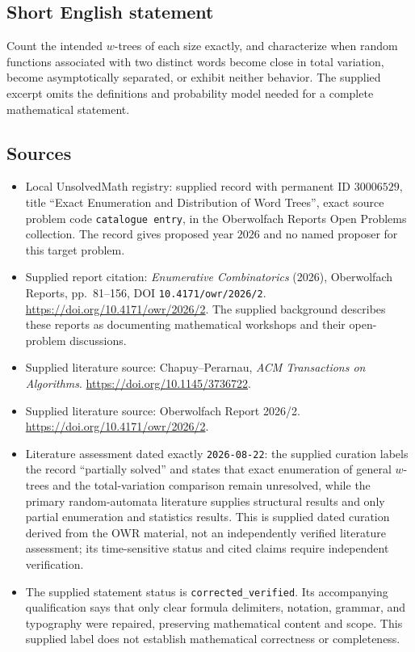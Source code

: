 \documentclass[11pt]{article}
\begin{document}
\subsection{Short English statement}
Count the intended \(w\)-trees of each size exactly, and characterize when random functions associated with two distinct words become close in total variation, become asymptotically separated, or exhibit neither behavior. The supplied excerpt omits the definitions and probability model needed for a complete mathematical statement.
\subsection{Sources}
\begin{itemize}
\item Local UnsolvedMath registry: supplied record with permanent ID \(30006529\), title ``Exact Enumeration and Distribution of Word Trees'', exact source problem code \texttt{catalogue entry}, in the Oberwolfach Reports Open Problems collection. The record gives proposed year \(2026\) and no named proposer for this target problem.
\item Supplied report citation: \emph{Enumerative Combinatorics} (2026), Oberwolfach Reports, pp.~81--156, DOI \texttt{10.4171/owr/2026/2}. \url{https://doi.org/10.4171/owr/2026/2}. The supplied background describes these reports as documenting mathematical workshops and their open-problem discussions.
\item Supplied literature source: Chapuy--Perarnau, \emph{ACM Transactions on Algorithms}. \url{https://doi.org/10.1145/3736722}.
\item Supplied literature source: Oberwolfach Report 2026/2. \url{https://doi.org/10.4171/owr/2026/2}.
\item Literature assessment dated exactly \texttt{2026-08-22}: the supplied curation labels the record ``partially solved'' and states that exact enumeration of general \(w\)-trees and the total-variation comparison remain unresolved, while the primary random-automata literature supplies structural results and only partial enumeration and statistics results. This is supplied dated curation derived from the OWR material, not an independently verified literature assessment; its time-sensitive status and cited claims require independent verification.
\item The supplied statement status is \texttt{corrected\_verified}. Its accompanying qualification says that only clear formula delimiters, notation, grammar, and typography were repaired, preserving mathematical content and scope. This supplied label does not establish mathematical correctness or completeness.
\end{itemize}
\end{document}
